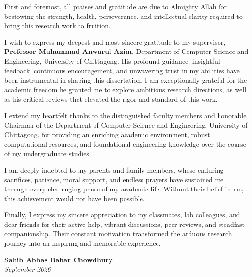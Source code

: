 
\begin{acknowledgements}

First and foremost, all praises and gratitude are due to Almighty Allah for bestowing the strength, health, perseverance, and intellectual clarity required to bring this research work to fruition.

I wish to express my deepest and most sincere gratitude to my supervisor, \textbf{Professor Muhammad Anwarul Azim}, Department of Computer Science and Engineering, University of Chittagong. His profound guidance, insightful feedback, continuous encouragement, and unwavering trust in my abilities have been instrumental in shaping this dissertation. I am exceptionally grateful for the academic freedom he granted me to explore ambitious research directions, as well as his critical reviews that elevated the rigor and standard of this work.

I extend my heartfelt thanks to the distinguished faculty members and honorable Chairman of the Department of Computer Science and Engineering, University of Chittagong, for providing an enriching academic environment, robust computational resources, and foundational engineering knowledge over the course of my undergraduate studies.

I am deeply indebted to my parents and family members, whose enduring sacrifices, patience, moral support, and endless prayers have sustained me through every challenging phase of my academic life. Without their belief in me, this achievement would not have been possible.

Finally, I express my sincere appreciation to my classmates, lab colleagues, and dear friends for their active help, vibrant discussions, peer reviews, and steadfast companionship. Their constant motivation transformed the arduous research journey into an inspiring and memorable experience.

\vspace{1.5cm}
\begin{flushright}
\textbf{Sahib Abbas Bahar Chowdhury}\\
\textit{September 2026}
\end{flushright}

\end{acknowledgements}
